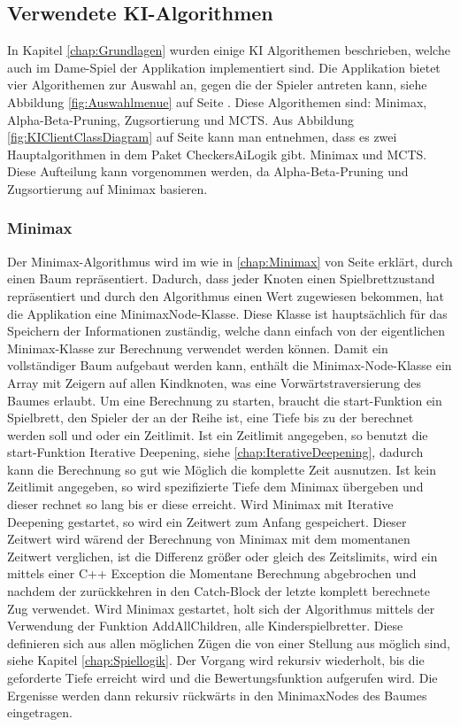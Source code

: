 \documentclass[12pt,a4paper,bibliography=totocnumbered,listof=totocnumbered]{article}
\begin{document}
\subsection{Verwendete KI-Algorithmen}
\label{chap:KIAlgorithms}
In Kapitel \ref{chap:Grundlagen} wurden einige KI Algorithemen beschrieben, welche auch im Dame-Spiel der Applikation implementiert sind.
Die Applikation bietet vier Algorithemen zur Auswahl an, gegen die der Spieler antreten kann, siehe Abbildung \ref{fig:Auswahlmenue} auf Seite \pageref{fig:Auswahlmenue}. 
Diese Algorithemen sind: Minimax, Alpha-Beta-Pruning, Zugsortierung und MCTS.
Aus Abbildung \ref{fig:KIClientClassDiagram} auf Seite \pageref{fig:KIClientClassDiagram}
kann man entnehmen, dass es zwei Hauptalgorithmen in dem Paket CheckersAiLogik gibt. Minimax und MCTS. Diese Aufteilung kann vorgenommen werden,
da Alpha-Beta-Pruning und Zugsortierung auf Minimax basieren.


\subsubsection{Minimax}
Der Minimax-Algorithmus wird im wie in \ref{chap:Minimax} von Seite \pageref{chap:Minimax} erklärt, durch einen Baum repräsentiert. Dadurch, dass jeder Knoten einen Spielbrettzustand
repräsentiert und durch den Algorithmus einen Wert zugewiesen bekommen, hat die Applikation eine MinimaxNode-Klasse.
Diese Klasse ist hauptsächlich für das Speichern der Informationen zuständig, welche dann einfach von der eigentlichen Minimax-Klasse zur Berechnung
verwendet werden können. Damit ein vollständiger Baum aufgebaut werden kann, enthält die Minimax-Node-Klasse ein Array mit Zeigern auf allen 
Kindknoten, was eine Vorwärtstraversierung des Baumes erlaubt. 
Um eine Berechnung zu starten, braucht die start-Funktion ein Spielbrett, den Spieler der an der Reihe ist, eine
Tiefe bis zu der berechnet werden soll und oder ein Zeitlimit. Ist ein Zeitlimit angegeben, so benutzt die start-Funktion Iterative Deepening, siehe
\ref{chap:IterativeDeepening}, dadurch kann die Berechnung so gut wie Möglich die komplette Zeit ausnutzen. Ist kein Zeitlimit angegeben, 
so wird spezifizierte Tiefe dem Minimax übergeben und dieser rechnet so lang bis er diese erreicht. Wird Minimax mit Iterative Deepening gestartet, so
wird ein Zeitwert zum Anfang gespeichert. Dieser Zeitwert wird wärend der Berechnung von Minimax mit dem momentanen Zeitwert verglichen, ist die 
Differenz größer oder gleich des Zeitslimits, wird ein mittels einer C++ Exception die Momentane Berechnung abgebrochen und nachdem der zurückkehren in 
den Catch-Block der letzte komplett berechnete Zug verwendet. 
Wird Minimax gestartet, holt sich der Algorithmus mittels der Verwendung der Funktion AddAllChildren, alle Kinderspielbretter. Diese 
definieren sich aus allen möglichen Zügen die von einer Stellung aus möglich sind, siehe Kapitel \ref{chap:Spiellogik}. Der Vorgang wird 
rekursiv wiederholt, bis die geforderte Tiefe erreicht wird und die Bewertungsfunktion aufgerufen wird. Die Ergenisse werden dann rekursiv rückwärts in 
den MinimaxNodes des Baumes eingetragen.
\end{document}

